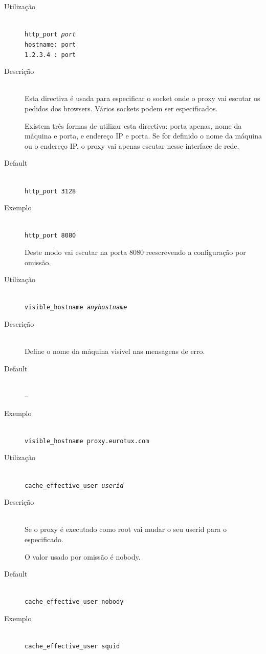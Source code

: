 \begin{description}
\item[Utilização]~\\
\texttt{http\_port \emph{port}\\
hostname: port\\
1.2.3.4 : port}

\item[Descrição]~\\
Esta directiva é usada para especificar o socket onde o proxy vai
escutar os pedidos dos browsers. Vários sockets podem ser
especificados.

Existem três formas de utilizar esta directiva: porta apenas, nome
da máquina e porta, e endereço IP e porta.
Se for definido o nome da máquina ou o endereço IP, o proxy vai
apenas escutar nesse interface de rede.

\item[Default]~\\
\texttt{http\_port 3128}

\item[Exemplo]~\\
\texttt{http\_port 8080}

Deste modo vai escutar na porta 8080 reescrevendo a configuração
por omissão.
\end{description}


\begin{description}
\item[Utilização]~\\
\texttt{visible\_hostname \emph{anyhostname}}

\item[Descrição]~\\
Define o nome da máquina visível nas mensagens de erro.

\item[Default]~\\
--

\item[Exemplo]~\\
\texttt{visible\_hostname proxy.eurotux.com}
\end{description}


\begin{description}
\item[Utilização]~\\
\texttt{cache\_effective\_user \emph{userid}}

\item[Descrição]~\\
Se o proxy é executado como root vai mudar o seu userid para o
especificado.

O valor usado por omissão é nobody.

\item[Default]~\\
\texttt{cache\_effective\_user nobody}

\item[Exemplo]~\\
\texttt{cache\_effective\_user squid}
\end{description}


